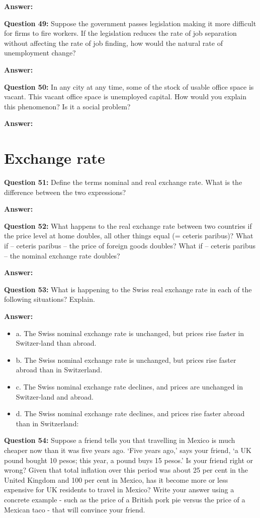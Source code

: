 \documentclass[a4paper, 11pt]{article}
\begin{document}
\textbf{Answer:}

\textbf{Question 49:} Suppose the government passes legislation making it more difficult for firms to fire workers. If the legislation reduces the rate of job separation without affecting the rate of job finding, how would the natural rate of unemployment change?

\textbf{Answer:}

\textbf{Question 50:} In any city at any time, some of the stock of usable office space is vacant. This vacant office space is unemployed capital. How would you explain this phenomenon? Is it a social problem?

\textbf{Answer:}

\section{Exchange rate}

\textbf{Question 51:} Define the terms nominal and real exchange rate. What is the difference between the two expressions?

\textbf{Answer:}

\textbf{Question 52:} What happens to the real exchange rate between two countries if the price level at home doubles, all other things equal (= ceteris paribus)? What if – ceteris paribus – the price of foreign goods doubles? What if – ceteris paribus – the nominal exchange rate doubles?

\textbf{Answer:}

\textbf{Question 53:} What is happening to the Swiss real exchange rate in each of the following situations? Explain.

\textbf{Answer:}
\begin{itemize}
\item a. The Swiss nominal exchange rate is unchanged, but prices rise faster in Switzer-land than abroad.
\item b. The Swiss nominal exchange rate is unchanged, but prices rise faster abroad than in Switzerland.
\item c. The Swiss nominal exchange rate declines, and prices are unchanged in Switzer-land and abroad.
\item d. The Swiss nominal exchange rate declines, and prices rise faster abroad than in Switzerland:
\end{itemize}


\textbf{Question 54:} Suppose a friend tells you that travelling in Mexico is much cheaper now than it was five years ago. ‘Five years ago,’ says your friend, ‘a UK pound bought 10 pesos; this year, a pound buys 15 pesos.’ Is your friend right or wrong? Given that total inflation over this period was about 25 per cent in the United Kingdom and 100 per cent in Mexico, has it become more or less expensive for UK residents to travel in Mexico? Write your answer using a concrete example - such as the price of a British pork pie versus the price of a Mexican taco - that will convince your friend.
\end{document}
